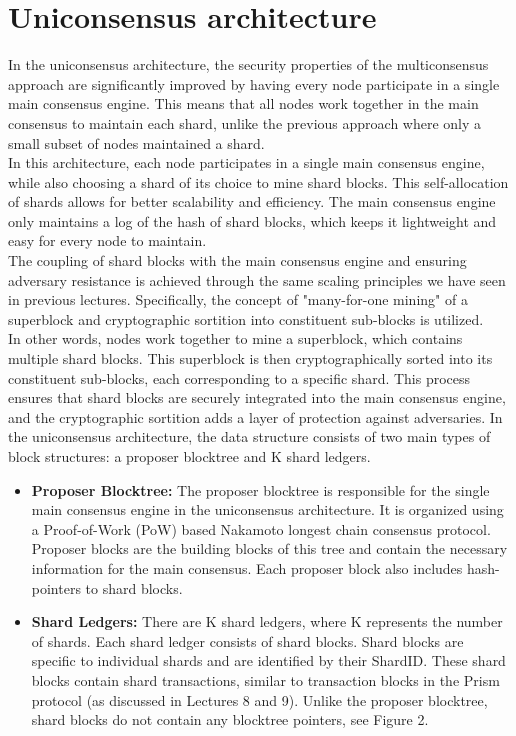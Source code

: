 \documentclass{report}
\begin{document}
\section{Uniconsensus architecture}
In the uniconsensus architecture, the security properties of the multiconsensus approach are significantly improved by having every node participate in a single main consensus engine. This means that all nodes work together in the main consensus to maintain each shard, unlike the previous approach where only a small subset of nodes maintained a shard.\\
In this architecture, each node participates in a single main consensus engine, while also choosing a shard of its choice to mine shard blocks. This self-allocation of shards allows for better scalability and efficiency. The main consensus engine only maintains a log of the hash of shard blocks, which keeps it lightweight and easy for every node to maintain.\\
The coupling of shard blocks with the main consensus engine and ensuring adversary resistance is achieved through the same scaling principles we have seen in previous lectures. Specifically, the concept of "many-for-one mining" of a superblock and cryptographic sortition into constituent sub-blocks is utilized.\\
In other words, nodes work together to mine a superblock, which contains multiple shard blocks. This superblock is then cryptographically sorted into its constituent sub-blocks, each corresponding to a specific shard. This process ensures that shard blocks are securely integrated into the main consensus engine, and the cryptographic sortition adds a layer of protection against adversaries.
In the uniconsensus architecture, the data structure consists of two main types of block structures: a proposer blocktree and K shard ledgers.\\
\begin{itemize}
	\item \textbf{Proposer Blocktree:} The proposer blocktree is responsible for the single main consensus engine in the uniconsensus architecture. It is organized using a Proof-of-Work (PoW) based Nakamoto longest chain consensus protocol. Proposer blocks are the building blocks of this tree and contain the necessary information for the main consensus. Each proposer block also includes hash-pointers to shard blocks.
	\item \textbf{Shard Ledgers:} There are K shard ledgers, where K represents the number of shards. Each shard ledger consists of shard blocks. Shard blocks are specific to individual shards and are identified by their ShardID. These shard blocks contain shard transactions, similar to transaction blocks in the Prism protocol (as discussed in Lectures 8 and 9). Unlike the proposer blocktree, shard blocks do not contain any blocktree pointers, see Figure 2.
\end{itemize}
\end{document}
